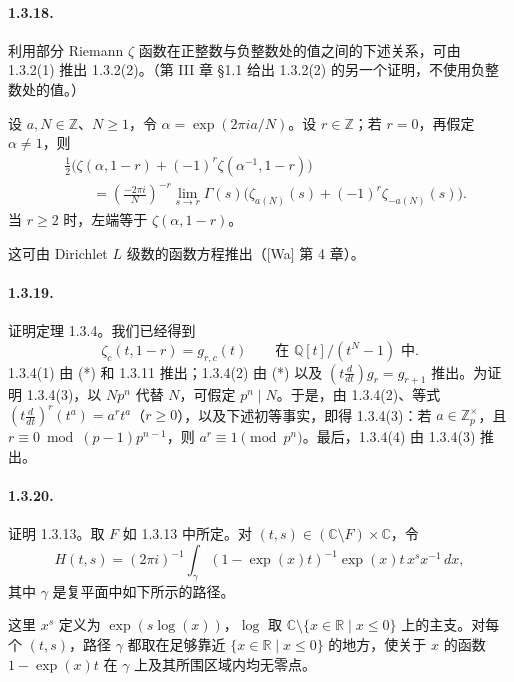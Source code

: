\paragraph{1.3.18.}
利用部分 Riemann $\zeta$ 函数在正整数与负整数处的值之间的下述关系，可由 1.3.2(1) 推出 1.3.2(2)。（第 III 章 §1.1 给出 1.3.2(2) 的另一个证明，不使用负整数处的值。）

设 $a,N\in\mathbb Z$、$N\geq1$，令 $\alpha=\exp(2\pi ia/N)$。设 $r\in\mathbb Z$；若 $r=0$，再假定 $\alpha\ne1$，则
\begin{align*}
&\frac12\bigl(\zeta(\alpha,1-r)+(-1)^r\zeta(\alpha^{-1},1-r)\bigr)\\
&\qquad=\left(\frac{-2\pi i}{N}\right)^{-r}
\lim_{s\to r}\Gamma(s)\bigl(\zeta_{a(N)}(s)+(-1)^r\zeta_{-a(N)}(s)\bigr).
\end{align*}
当 $r\geq2$ 时，左端等于 $\zeta(\alpha,1-r)$。

这可由 Dirichlet $L$ 级数的函数方程推出（[Wa] 第 4 章）。

\paragraph{1.3.19.}
证明定理 1.3.4。我们已经得到
\[
\zeta_c(t,1-r)=g_{r,c}(t)\qquad\text{在 $\mathbb Q[t]/(t^N-1)$ 中}.\tag{*}
\]
1.3.4(1) 由 (*) 和 1.3.11 推出；1.3.4(2) 由 (*) 以及
$\left(t\frac d{dt}\right)g_r=g_{r+1}$ 推出。为证明 1.3.4(3)，以 $Np^n$ 代替 $N$，可假定 $p^n\mid N$。于是，由 1.3.4(2)、等式
$\left(t\frac d{dt}\right)^r(t^a)=a^rt^a$（$r\geq0$），以及下述初等事实，即得 1.3.4(3)：若 $a\in\mathbb Z_p^\times$，且
$r\equiv0\bmod(p-1)p^{n-1}$，则 $a^r\equiv1\pmod{p^n}$。最后，1.3.4(4) 由 1.3.4(3) 推出。

\paragraph{1.3.20.}
证明 1.3.13。取 $F$ 如 1.3.13 中所定。对
$(t,s)\in(\mathbb C\setminus F)\times\mathbb C$，令
\[
H(t,s)=(2\pi i)^{-1}\int_\gamma
(1-\exp(x)t)^{-1}\exp(x)t\,x^s x^{-1}\,dx,\tag{1}
\]
其中 $\gamma$ 是复平面中如下所示的路径。
\begin{center}
\end{center}
这里 $x^s$ 定义为 $\exp(s\log(x))$，$\log$ 取
$\mathbb C\setminus\{x\in\mathbb R\mid x\leq0\}$ 上的主支。对每个 $(t,s)$，路径 $\gamma$ 都取在足够靠近
$\{x\in\mathbb R\mid x\leq0\}$ 的地方，使关于 $x$ 的函数 $1-\exp(x)t$ 在 $\gamma$ 上及其所围区域内均无零点。

